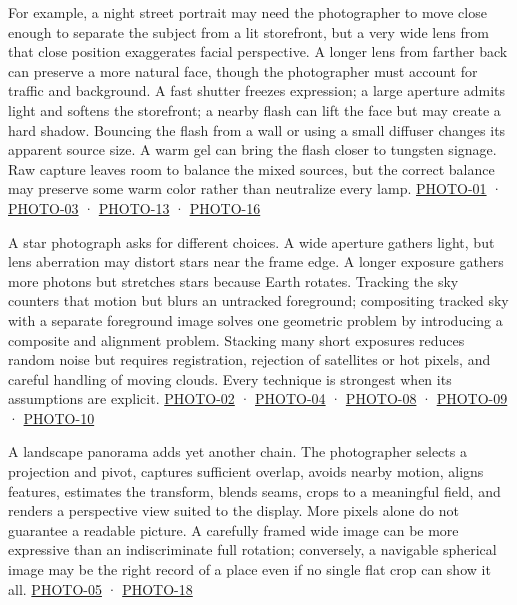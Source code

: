 For example, a night street portrait may need the photographer to move close enough to separate the subject from a lit storefront, but a very wide lens from that close position exaggerates facial perspective. A longer lens from farther back can preserve a more natural face, though the photographer must account for traffic and background. A fast shutter freezes expression; a large aperture admits light and softens the storefront; a nearby flash can lift the face but may create a hard shadow. Bouncing the flash from a wall or using a small diffuser changes its apparent source size. A warm gel can bring the flash closer to tungsten signage. Raw capture leaves room to balance the mixed sources, but the correct balance may preserve some warm color rather than neutralize every lamp. \hyperref[04-visual-computing-ii-ch036-photo-01---photography-session-01]{PHOTO-01} · \hyperref[04-visual-computing-ii-ch036-photo-03---photography-session-03]{PHOTO-03} · \hyperref[04-visual-computing-ii-ch036-photo-13---photography-session-13]{PHOTO-13} · \hyperref[04-visual-computing-ii-ch036-photo-16---photography-session-16]{PHOTO-16}

A star photograph asks for different choices. A wide aperture gathers light, but lens aberration may distort stars near the frame edge. A longer exposure gathers more photons but stretches stars because Earth rotates. Tracking the sky counters that motion but blurs an untracked foreground; compositing tracked sky with a separate foreground image solves one geometric problem by introducing a composite and alignment problem. Stacking many short exposures reduces random noise but requires registration, rejection of satellites or hot pixels, and careful handling of moving clouds. Every technique is strongest when its assumptions are explicit. \hyperref[04-visual-computing-ii-ch036-photo-02---photography-session-02]{PHOTO-02} · \hyperref[04-visual-computing-ii-ch036-photo-04---photography-session-04]{PHOTO-04} · \hyperref[04-visual-computing-ii-ch036-photo-08---photography-session-08]{PHOTO-08} · \hyperref[04-visual-computing-ii-ch036-photo-09---photography-session-09]{PHOTO-09} · \hyperref[04-visual-computing-ii-ch036-photo-10---photography-session-10]{PHOTO-10}

A landscape panorama adds yet another chain. The photographer selects a projection and pivot, captures sufficient overlap, avoids nearby motion, aligns features, estimates the transform, blends seams, crops to a meaningful field, and renders a perspective view suited to the display. More pixels alone do not guarantee a readable picture. A carefully framed wide image can be more expressive than an indiscriminate full rotation; conversely, a navigable spherical image may be the right record of a place even if no single flat crop can show it all. \hyperref[04-visual-computing-ii-ch036-photo-05---photography-session-05]{PHOTO-05} · \hyperref[04-visual-computing-ii-ch036-photo-18---photography-session-18]{PHOTO-18}

